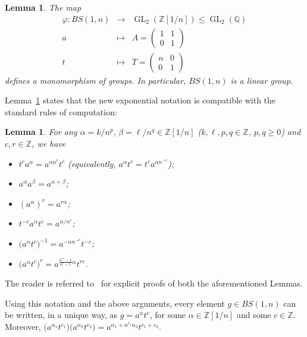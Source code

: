 \documentclass[a4paper]{amsart}
\newtheorem{lem}[thm]{Lemma}
\theoremstyle{definition}
\newcommand\ZZ{\mathbb{Z}}
\newcommand{\QQ}{{\mathbb Q}}
\newcommand{\GL}{\operatorname{GL}}
\begin{document}
\begin{lem}\label{lem: linearity}
The map
 \begin{equation}\label{eq: BS into GL2}
\begin{array}{rcl} \varphi\colon BS(1,n) & \to & \GL_2(\ZZ[1/n])\leqslant \GL_2(\QQ) \\[3pt] a & \mapsto & A=\left(\begin{smallmatrix} 1 & 1 \\ 0 & 1 \end{smallmatrix}\right) \\[3pt] t & \mapsto & T=\left(\begin{smallmatrix} n & 0 \\ 0 & 1 \end{smallmatrix}\right) \end{array}
 \end{equation}
defines a monomorphism of groups. In particular, $BS(1,n)$ is a linear group. 
\end{lem}


Lemma~\ref{lem: calculs} states that the new exponential notation is compatible with the standard rules of computation: 

\begin{lem}\label{lem: calculs}
For any $\alpha =k/n^p,\, \beta=\ell/n^q\in \ZZ[1/n]$ ($k,\ell, p,q\in \ZZ$, $p,q\geq 0$) and $c, r\in \ZZ$, we have 
\begin{itemize}
\item[(i)] $t^c a^{\alpha} =a^{\alpha n^c} t^c$ (equivalently, $a^{\alpha} t^c= t^c a^{\alpha n^{-c}}$);
\item[(ii)] $a^{\alpha}a^{\beta}=a^{\alpha+\beta}$;
\item[(iii)] $(a^{\alpha})^r =a^{r\alpha}$;
\item[(iv)] $t^{-c}a^{\alpha}t^c=a^{\alpha/n^c}$;
\item[(v)] $\big( a^{\alpha}t^c \big)^{-1}=a^{-\alpha n^{-c}} t^{-c}$; 
\item[(vi)] $\big( a^{\alpha}t^c \big)^r = a^{\frac{n^{rc}-1}{n^c-1}\alpha} t^{rc}$.
\end{itemize}
\end{lem}

The reader is referred to~\cite{Roy-Ventura-Mitra} for explicit proofs of both the aforementioned Lemmas.

Using this notation and the above arguments, every element $g\in BS(1,n)$ can be written, in a unique way, as $g=a^{\alpha}t^c$, for some $\alpha\in \ZZ[1/n]$ and some $c\in \ZZ$. Moreover, $\big( a^{\alpha_1}t^{c_1} \big)\big( a^{\alpha_2}t^{c_2} \big) =a^{\alpha_1 +n^{c_1}\alpha_2} t^{c_1+c_2}$.
\end{document}
